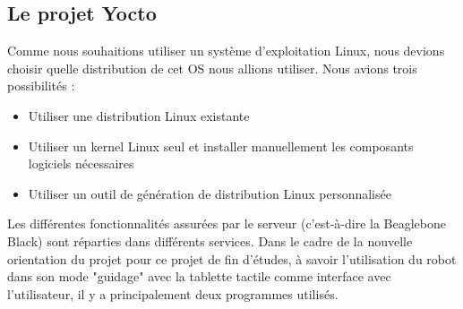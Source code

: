 \documentclass{report}
\begin{document}
    \subsection{Le projet Yocto}
    {Comme nous souhaitions utiliser un système d'exploitation Linux, nous devions
    choisir quelle distribution de cet OS nous allions utiliser. Nous avions trois
    possibilités :}
    \begin{itemize}
      \item Utiliser une distribution Linux existante
      \item Utiliser un kernel Linux seul et installer manuellement les composants logiciels nécessaires
      \item Utiliser un outil de génération de distribution Linux personnalisée
    \end{itemize}

    



    {Les différentes fonctionnalités assurées par le serveur (c'est-à-dire la
    Beaglebone Black) sont réparties dans différents services. Dans le cadre de la
    nouvelle orientation du projet pour ce projet de fin d'études, à savoir l'utilisation
    du robot dans son mode "guidage" avec la tablette tactile comme interface avec
    l'utilisateur, il y a principalement deux programmes utilisés.}
\end{document}
